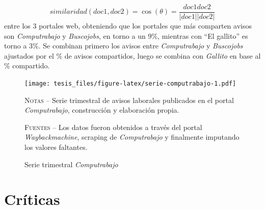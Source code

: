 \documentclass[12pt,oneside]{reedthesis}
\begin{document}
\[
similaridad(doc1, doc2) = \cos(\theta) = \frac{doc1doc2}{|doc1||doc2|}
\]
entre los 3 portales web, obteniendo que los portales que más comparten avisos son \emph{Computrabajo} y \emph{Buscojobs}, en torno a un 9\%, mientras con ``El gallito'' es torno a 3\%. Se combinan primero los avisos entre \emph{Computrabajo} y \emph{Buscojobs} ajustados por el \% de avisos compartidos, luego se combina con \emph{Gallito} en base al \% compartido.
\begin{figure}
\texttt{[image: tesis\_files/figure-latex/serie-computrabajo-1.pdf]}
\caption{Serie trimestral \textit{Computrabajo}}\label{fig:serie-computrabajo}\textsc{}

\footnotesize\textsc{Notas} -- Serie trimestral de avisos laborales publicados en el portal \textit{Computrabajo}, construcción y elaboración propia.

\textsc{Fuentes} -- Los datos fueron obtenidos a través del portal \textit{Waybackmachine}, scraping de \textit{Computrabajo} y finalmente imputando los valores faltantes.
\end{figure}
\hypertarget{cruxedticas}{%
\section{Críticas}\label{cruxedticas}}
\end{document}
